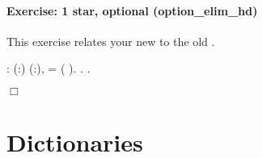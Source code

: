 \documentclass[12pt]{report}
\begin{document}
\paragraph{Exercise: 1 star, optional (option\_elim\_hd)}

 This exercise relates your new  to the old . \begin{coqdoccode}
\coqdocemptyline
\coqdocnoindent
{}  : \coqdockw{\ensuremath{\forall}} (:) (:),\coqdoceol
\coqdocindent{1.00em}
   =   ( ).\coqdoceol
\coqdocnoindent
{}.\coqdoceol
 .\coqdoceol
\end{coqdoccode}
\ensuremath{\Box} \begin{coqdoccode}
\coqdocemptyline
\end{coqdoccode}
\section{Dictionaries}
\end{document}
